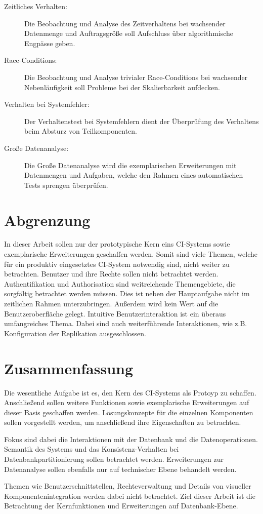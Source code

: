 \begin{description}
  \item[Zeitliches Verhalten:]
    Die Beobachtung und Analyse des Zeitverhaltens
    bei wachsender Datenmenge und Auftragsgröße soll Aufschluss über algorithmische Engpässe geben.
  \item[Race-Conditions:]
    Die Beobachtung und Analyse trivialer Race-Conditions
    bei wachsender Nebenl\"aufigkeit soll Probleme bei der Skalierbarkeit aufdecken.
  \item[Verhalten bei Systemfehler:]
      Der Verhaltenstest bei Systemfehlern dient der
    \"Uberpr\"ufung des Verhaltens beim Absturz von Teilkomponenten.
  \item[Große Datenanalyse:]
    Die Große Datenanalyse wird die exemplarischen Erweiterungen mit Datenmengen und Aufgaben,
    welche den Rahmen eines automatischen Tests sprengen überprüfen.
\end{description}


\section{Abgrenzung}
\label{sec:target:abgrenzung}

In dieser Arbeit sollen nur der prototypische Kern eins \ac{CI}-Systems
sowie exemplarische Erweiterungen geschaffen werden.
Somit sind viele Themen, welche für ein produktiv eingesetztes \ac{CI}-System notwendig
sind, nicht weiter zu betrachten.
Benutzer und ihre Rechte sollen nicht betrachtet werden.
Authentifikation und Authorisation sind weitreichende Themengebiete,
die sorgfältig betrachtet werden müssen.
Dies ist neben der Hauptaufgabe nicht im zeitlichen Rahmen unterzubringen.
Außerdem wird kein Wert auf die Benutzeroberfläche gelegt.
Intuitive Benutzerinteraktion ist ein überaus umfangreiches Thema.
Dabei sind auch weiterführende Interaktionen,
wie z.B. Konfiguration der Replikation ausgeschlossen.


\section{Zusammenfassung}
\label{sec:target:zusammenfassung}

Die wesentliche Aufgabe ist es, den Kern des \ac{CI}-Systems als Protoyp zu schaffen.
Anschließend sollen weitere Funktionen sowie exemplarische Erweiterungen
auf dieser Basis geschaffen werden.
L\"osungskonzepte f\"ur die einzelnen Komponenten sollen vorgestellt werden,
um anschließend ihre Eigenschaften zu betrachten.

Fokus sind dabei die Interaktionen mit der Datenbank und die Datenoperationen.
Semantik des Systems und das Konsistenz-Verhalten bei Datenbankpartitionierung
sollen betrachtet werden. Erweiterungen zur Datenanalyse sollen ebenfalls nur auf technischer Ebene behandelt werden.

Themen wie Benutzerschnittstellen, Rechteverwaltung und Details
von visueller Komponentenintegration werden dabei nicht betrachtet.
Ziel dieser Arbeit ist die Betrachtung der Kernfunktionen und Erweiterungen auf Datenbank-Ebene.

